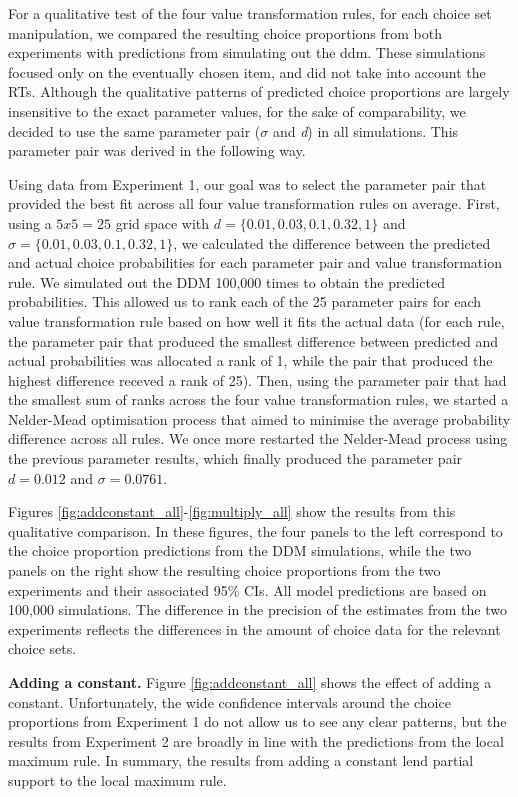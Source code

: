 \documentclass[11pt,a4paper]{article}
\begin{document}
For a qualitative test of the four value transformation rules, for each choice set manipulation, we compared the resulting choice proportions from both experiments with predictions from simulating out the ddm. These simulations focused only on the eventually chosen item, and did not take into account the RTs. Although the qualitative patterns of predicted choice proportions are largely insensitive to the exact parameter values, for the sake of comparability, we decided to use the same parameter pair ($\sigma$ and \textit{d}) in all simulations. This parameter pair was derived in the following way.

Using data from Experiment 1, our goal was to select the parameter pair that provided the best fit across all four value transformation rules on average. First, using a $5x5=25$ grid space with $d=\{0.01, 0.03, 0.1, 0.32, 1\}$ and $\sigma=\{0.01, 0.03, 0.1, 0.32, 1\}$,  we calculated the difference between the predicted and actual choice probabilities for each parameter pair and value transformation rule. We simulated out the DDM 100,000 times to obtain the predicted probabilities. This allowed us to rank each of the 25 parameter pairs for each value transformation rule based on how well it fits the actual data (for each rule, the parameter pair that produced the smallest difference between predicted and actual probabilities was allocated a rank of 1, while the pair that produced the highest difference receved a rank of 25). Then, using the parameter pair that had the smallest sum of ranks across the four value transformation rules, we started a Nelder-Mead optimisation process that aimed to minimise the average probability difference across all rules. We once more restarted the Nelder-Mead process using the previous parameter results, which finally produced the parameter pair $d=0.012$ and $\sigma=0.0761$.

Figures \ref{fig:addconstant_all}-\ref{fig:multiply_all} show the results from this qualitative comparison. In these figures, the four panels to the left correspond to the choice proportion predictions from the DDM simulations, while the two panels on the right show the resulting choice proportions from the two experiments and their associated 95\% CIs. All model predictions are based on 100,000 simulations. The difference in the precision of the estimates from the two experiments reflects the differences in the amount of choice data for the relevant choice sets.  

\textbf{Adding a constant.} Figure \ref{fig:addconstant_all} shows the effect of adding a constant. Unfortunately, the wide confidence intervals around the choice proportions from Experiment 1 do not allow us to see any clear patterns, but the results from Experiment 2 are broadly in line with the predictions from the local maximum rule. In summary, the results from adding a constant lend partial support to the local maximum rule.  
\end{document}
